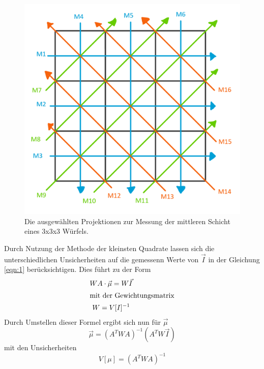 \begin{figure}
  \centering
  \includegraphics[scale=0.5]{graphics/wuerfel.png}
  \caption{Die ausgewählten Projektionen zur Messung der mittleren Schicht eines 3x3x3 Würfels.}
  \label{fig:wuerfel}
\end{figure}

Durch Nutzung der Methode der kleinsten Quadrate lassen sich die unterschiedlichen Unsicherheiten auf die gemessenn Werte von $\vec{I}$ in der Gleichung \ref{eqn:1} berücksichtigen. Dies führt zu der Form
\begin{gather}
  WA\cdot\vec{\mu}=W\vec{I} \\
  \intertext{mit der Gewichtungsmatrix}
  W=V[I]^{-1}
\end{gather}
Durch Umstellen dieser Formel ergibt sich nun für $\vec{\mu}$
\begin{equation}
  \vec{\mu}=\left(A^TWA\right)^{-1}\left(A^TW\vec{I}\right)
\end{equation}
mit den Unsicherheiten
\begin{equation}
  V[\mu]=\left(A^TWA\right)^{-1}
\end{equation}
